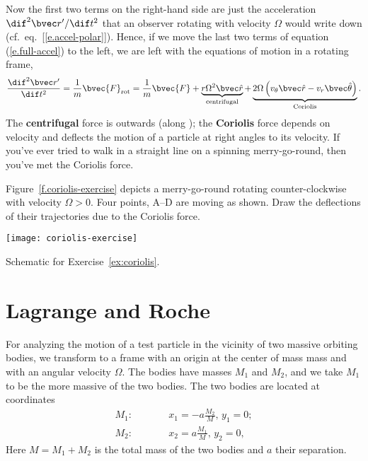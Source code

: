 Now the first two terms on the right-hand side are just the acceleration $\dif^{2}\rv'/\dif t^{2}$ that an observer rotating with velocity $\Omega$ would write down (cf.\ eq.~[\ref{e.accel-polar}]).  Hence, if we move the last two terms of equation (\ref{e.full-accel}) to the left, we are left with the equations of motion in a rotating frame,
\begin{equation}\label{e.motion-rotating}
\DDtt{\rv'} = \frac{1}{m}\bvec{F}_{\mathrm{rot}} = \frac{1}{m}\bvec{F} 
	+  \underbrace{r\Omega^{2}\rhat}_{\textrm{centrifugal}}
	+	\underbrace{2\Omega\left(v_{\theta}\rhat - v_{r}\thetahat \right)}_{\textrm{Coriolis}}.
\end{equation}
The \textbf{centrifugal} force is outwards (along \rhat); the \textbf{Coriolis} force depends on velocity and deflects the motion of a particle at right angles to its velocity.  If you've ever tried to walk in a straight line on a spinning merry-go-round, then you've met the Coriolis force.

\begin{exercisebox}
\label{ex:coriolis}
Figure~\ref{f.coriolis-exercise} depicts a merry-go-round rotating counter-clockwise with velocity $\Omega > 0$.  Four points, A--D are moving as shown.  Draw the deflections of their trajectories due to the Coriolis force.
\end{exercisebox}
\begin{marginfigure}
\texttt{[image: coriolis-exercise]}
\caption[Movement on a merry-go-round]{Schematic for Exercise~\ref{ex:coriolis}.
\label{f.coriolis-exercise}}
\end{marginfigure}

\section{Lagrange and Roche}
For analyzing the motion of a test particle in the vicinity of two massive orbiting bodies, we transform to a frame with an origin at the center of mass mass and with an angular velocity $\Omega$.  The bodies have masses $M_{1}$ and $M_{2}$, and we take $M_{1}$ to be the more massive of the two bodies.  The two bodies are located at coordinates
\begin{eqnarray}
	M_{1}:&\qquad& x_{1} = -a\frac{M_{2}}{M},\,y_{1} = 0;\\
	M_{2}:&\qquad& x_{2} = a\frac{M_{1}}{M},\,y_{2} = 0,
\end{eqnarray}
Here $M = M_{1}+M_{2}$ is the total mass of the two bodies and $a$ their separation.


